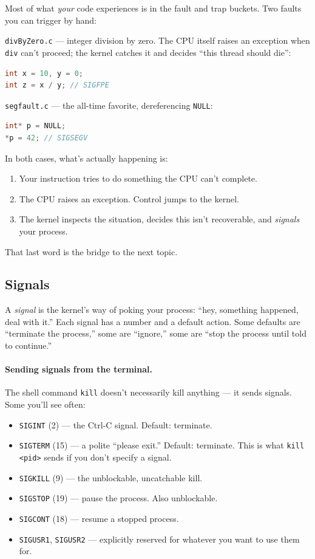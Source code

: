 \documentclass[11pt]{article}
\begin{document}
Most of what \emph{your} code experiences is in the fault and trap
buckets. Two faults you can trigger by hand:

\texttt{divByZero.c} --- integer division by zero. The CPU itself
raises an exception when \texttt{div} can't proceed; the kernel
catches it and decides ``this thread should die'':

\begin{lstlisting}[language=C]
int x = 10, y = 0;
int z = x / y; // SIGFPE
\end{lstlisting}

\texttt{segfault.c} --- the all-time favorite, dereferencing
\texttt{NULL}:

\begin{lstlisting}[language=C]
int* p = NULL;
*p = 42; // SIGSEGV
\end{lstlisting}

In both cases, what's actually happening is:
\begin{enumerate}
  \item Your instruction tries to do something the CPU can't complete.
  \item The CPU raises an exception. Control jumps to the kernel.
  \item The kernel inspects the situation, decides this isn't
    recoverable, and \emph{signals} your process.
\end{enumerate}

That last word is the bridge to the next topic.

\subsection*{Signals}

A \emph{signal} is the kernel's way of poking your process: ``hey,
something happened, deal with it.'' Each signal has a number and a
default action. Some defaults are ``terminate the process,'' some are
``ignore,'' some are ``stop the process until told to continue.''

\paragraph{Sending signals from the terminal.} The shell command
\texttt{kill} doesn't necessarily kill anything --- it sends signals.
Some you'll see often:

\begin{itemize}
  \item \texttt{SIGINT} (2) --- the Ctrl-C signal. Default: terminate.
  \item \texttt{SIGTERM} (15) --- a polite ``please exit.'' Default:
    terminate. This is what \texttt{kill <pid>} sends if you don't
    specify a signal.
  \item \texttt{SIGKILL} (9) --- the unblockable, uncatchable kill.
  \item \texttt{SIGSTOP} (19) --- pause the process.
    Also unblockable.
  \item \texttt{SIGCONT} (18) --- resume a stopped process.
  \item \texttt{SIGUSR1}, \texttt{SIGUSR2} --- explicitly reserved
    for whatever you want to use them for.
\end{itemize}
\end{document}

